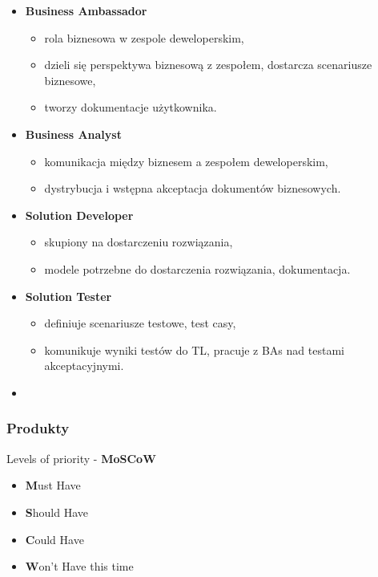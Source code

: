 \documentclass[a4paper]{article}
\begin{document}
\begin{itemize}
        \item \textbf{Business Ambassador}
        \begin{itemize}
            \item rola biznesowa w zespole deweloperskim,
            \item dzieli się perspektywa biznesową z zespołem, dostarcza scenariusze biznesowe,
            \item tworzy dokumentacje użytkownika.
        \end{itemize}
        \item \textbf{Business Analyst}
        \begin{itemize}
            \item komunikacja między biznesem a zespołem deweloperskim,
            \item dystrybucja i wstępna akceptacja dokumentów biznesowych.
        \end{itemize}
        \item \textbf{Solution Developer}
        \begin{itemize}
            \item skupiony na dostarczeniu rozwiązania,
            \item modele potrzebne do dostarczenia rozwiązania, dokumentacja.
        \end{itemize}
        \item \textbf{Solution Tester}
        \begin{itemize}
            \item definiuje scenariusze testowe, test casy,
            \item komunikuje wyniki testów do TL, pracuje z BAs nad testami akceptacyjnymi.
        \end{itemize}
        \item
    \end{itemize}

    \subsubsection{Produkty}

    Levels of priority - \textbf{MoSCoW}
    \begin{itemize}
        \item \textbf{M}ust Have
        \item \textbf{S}hould Have
        \item \textbf{C}ould Have
        \item \textbf{W}on’t Have this time
    \end{itemize}
\end{document}
